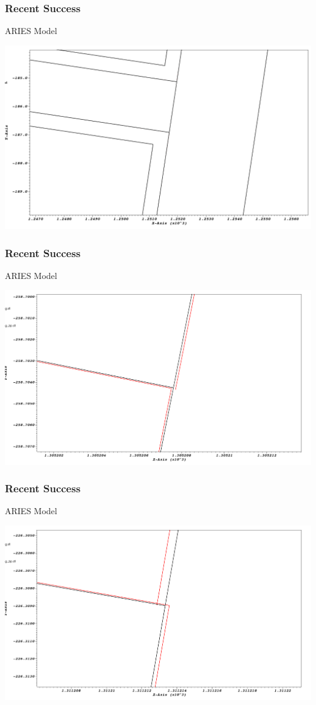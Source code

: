 \documentclass[14pt]{beamer}
\begin{document}
\begin{frame}
\frametitle{Recent Success}
ARIES Model
\begin{center}
\includegraphics[scale=0.25]{Channel_Corner_Zoomed.png}
\end{center}
\end{frame}

\begin{frame}
\frametitle{Recent Success}
ARIES Model
\begin{center}
\includegraphics[scale=0.25]{Channel_corner_broken_2.png}
\end{center}
\end{frame}

\begin{frame}
\frametitle{Recent Success}
ARIES Model
\begin{center}
\includegraphics[scale=0.25]{Channel_corner_broken_3.png}
\end{center}
\end{frame}
\end{document}
